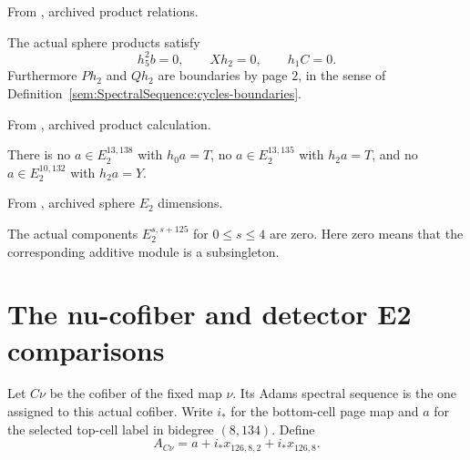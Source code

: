 \begin{theorem}
\label{sem:Computation:products-vanishing}
From \cite{LinProgram}, archived product relations.\par
The actual sphere products satisfy
\[h_5^2b=0,\qquad Xh_2=0,\qquad h_1C=0.\]
Furthermore $Ph_2$ and $Qh_2$ are boundaries by page $2$, in the sense of Definition~\ref{sem:SpectralSequence:cycles-boundaries}.
\end{theorem}

\begin{theorem}
\label{sem:Computation:nondivisibility}
From \cite{LinProgram}, archived product calculation.\par
There is no $a\in E_2^{13,138}$ with $h_0a=T$, no $a\in E_2^{13,135}$ with $h_2a=T$, and no $a\in E_2^{10,132}$ with $h_2a=Y$.
\end{theorem}

\begin{theorem}
\label{sem:Computation:vanishing-regions}
From \cite{LinProgram}, archived sphere $E_2$ dimensions.\par
The actual components $E_2^{s,s+125}$ for $0\leq s\leq4$ are zero. Here zero means that the corresponding additive module is a subsingleton.
\end{theorem}

\section{The nu-cofiber and detector E2 comparisons}

\begin{definition}
\label{sem:Computation:nu-cofiber}
Let $C\nu$ be the cofiber of the fixed map $\nu$. Its Adams spectral sequence is the one assigned to this actual cofiber. Write $i_*$ for the bottom-cell page map and $a$ for the selected top-cell label in bidegree $(8,134)$. Define
\[A_{C\nu}=a+i_*x_{126,8,2}+i_*x_{126,8}.\]
\end{definition}

